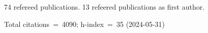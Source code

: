 74 refereed publications. 13 refeered publications as first author.

Total citations~=~4090; h-index~=~35 (2024-05-31)